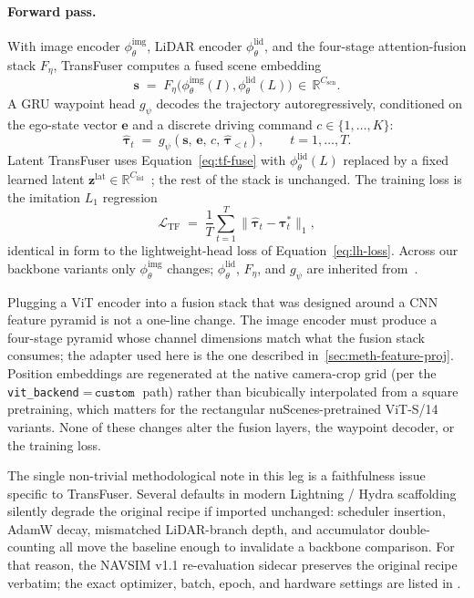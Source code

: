\paragraph{Forward pass.}
With image encoder $\phi^\text{img}_\theta$, LiDAR encoder $\phi^\text{lid}_\theta$, and the four-stage attention-fusion stack $F_\eta$, TransFuser computes a fused scene embedding
\begin{equation}
\label{eq:tf-fuse}
\mathbf{s} \;=\; F_\eta\!\bigl(\phi^\text{img}_\theta(I), \phi^\text{lid}_\theta(L)\bigr) \,\in\, \mathbb{R}^{C_\text{scn}}.
\end{equation}
A GRU waypoint head $g_\psi$ decodes the trajectory autoregressively, conditioned on the ego-state vector $\mathbf{e}$ and a discrete driving command $c \in \{1,\dots,K\}$:
\begin{equation}
\label{eq:tf-wp}
\hat{\boldsymbol\tau}_t \;=\; g_\psi(\mathbf{s},\, \mathbf{e},\, c,\, \hat{\boldsymbol\tau}_{<t}),
\qquad t = 1,\dots,T.
\end{equation}
Latent TransFuser uses Equation~\ref{eq:tf-fuse} with $\phi^\text{lid}_\theta(L)$ replaced by a fixed learned latent $\mathbf{z}^\text{lat} \in \mathbb{R}^{C_\text{lid}}$~\cite{dauner-navsim-2024}; the rest of the stack is unchanged. The training loss is the imitation $L_1$ regression
\begin{equation}
\label{eq:tf-loss}
\mathcal{L}_\text{TF} \;=\; \frac{1}{T}\sum_{t=1}^{T} \bigl\lVert \hat{\boldsymbol\tau}_t - \boldsymbol\tau^{\ast}_t \bigr\rVert_1,
\end{equation}
identical in form to the lightweight-head loss of Equation~\ref{eq:lh-loss}. Across our backbone variants only $\phi^\text{img}_\theta$ changes; $\phi^\text{lid}_\theta$, $F_\eta$, and $g_\psi$ are inherited from~\cite{chitta-transfuser-2023}.

Plugging a ViT encoder into a fusion stack that was designed around a CNN feature pyramid is not a one-line change. The image encoder must produce a four-stage pyramid whose channel dimensions match what the fusion stack consumes; the adapter used here is the one described in~\ref{sec:meth-feature-proj}. Position embeddings are regenerated at the native camera-crop grid (per the \texttt{vit\_backend}${=}\,\texttt{custom}$ path) rather than bicubically interpolated from a square pretraining, which matters for the rectangular nuScenes-pretrained ViT-S/14 variants. None of these changes alter the fusion layers, the waypoint decoder, or the training loss.

The single non-trivial methodological note in this leg is a faithfulness issue specific to TransFuser. Several defaults in modern Lightning / Hydra scaffolding silently degrade the original recipe if imported unchanged: scheduler insertion, AdamW decay, mismatched LiDAR-branch depth, and accumulator double-counting all move the baseline enough to invalidate a backbone comparison. For that reason, the NAVSIM v1.1 re-evaluation sidecar preserves the original recipe verbatim; the exact optimizer, batch, epoch, and hardware settings are listed in .

